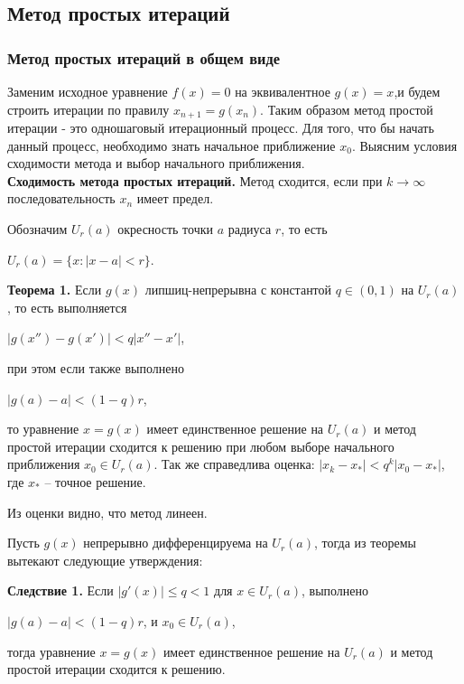 \documentclass{article}
\begin{document}
		
		\subsection{Метод простых итераций}
		
			\subsubsection{Метод простых итераций в общем виде}
				Заменим исходное уравнение $f(x)=0$ на эквивалентное $g(x)=x$,и будем строить итерации по правилу $x_{n+1} = g(x_n)$. Таким образом метод простой итерации - это одношаговый итерационный процесс. Для того, что бы начать данный процесс, необходимо знать начальное приближение $x_0$. Выясним условия сходимости метода и выбор начального приближения.\\
						
				\textbf{Сходимость метода простых итераций.}
				Метод сходится, если при $k \to \infty $ последовательность {$x_n$} имеет предел.
				
				Обозначим $U_r(a)$ окресность точки $a$ радиуса $r$, то есть \begin{center}$U_r(a) = \{x:|x-a|<r\}$.\end{center}

				\textbf{Теорема 1.} Если $g(x)$ липшиц-непрерывна с константой $q \in (0,1)$ на $U_r(a)$, то есть выполняется \begin{center}$|g(x'')-g(x')|<q|x''-x'|$,\end{center} при этом если также выполнено \begin{center}$|g(a)-a|<(1-q)r$,\end{center} то уравнение $x = g(x)$ имеет единственное решение на $U_r(a)$ и метод простой итерации сходится к решению при любом выборе начального приближения $x_0 \in U_r(a)$. Так же справедлива оценка: $|x_k-x_*|<q^k|x_0-x_*|$, где $x_*$ -- точное решение.
				
				
				Из оценки видно, что метод линеен.

				Пусть $g(x)$ непрерывно дифференцируема на $U_r(a)$, тогда из теоремы вытекают следующие утверждения:
				
				
				\textbf{Следствие 1.} Если $|g'(x)| \le q < 1$ для $x \in U_r(a)$, выполнено \begin{center}$|g(a)-a|<(1-q)r$, и $x_0 \in U_r(a)$,\end{center} тогда уравнение $x = g(x)$ имеет единственное решение на $U_r(a)$ и метод простой итерации сходится к решению.
				
\end{document}
